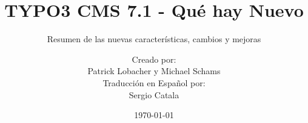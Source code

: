 %

%
%

\documentclass[t]{beamer}

\beamertemplatenavigationsymbolsempty

{
	\usetheme{typo3slides}
}

\title{TYPO3 CMS 7.1 - Qué hay Nuevo}
\subtitle{Resumen de las nuevas características, cambios y mejoras}
\author{
	\centerline{Creado por:}
	\centerline{Patrick Lobacher y Michael Schams}
	\vspace{0.4cm}
	\centerline{Traducción en Español por:}
	\centerline{Sergio Catala}
}

\date{\today}



\sharefont


\begingroup
	[default]
	\begin{frame}
		\titlepage
	\end{frame}
\endgroup


\section*{TYPO3 CMS 7.1 - Qué hay Nuevo}
\begin{frame}[fragile]
	\frametitle{Resumen de Capítulos}
	\framesubtitle{Resumen de Capítulos}

	\begin{multicols}{2}
		\tableofcontents
	\end{multicols}

\end{frame}

